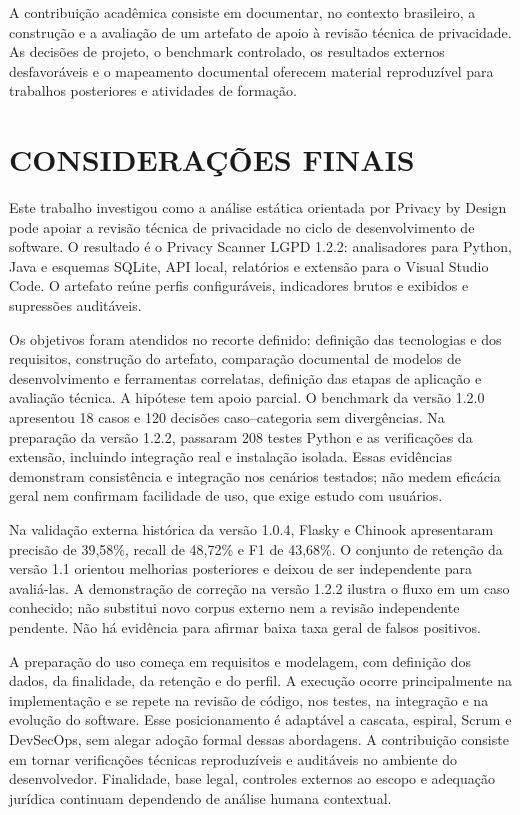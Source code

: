 \documentclass[12pt,a4paper,oneside]{report}
\begin{document}
A contribuição acadêmica consiste em documentar, no contexto brasileiro, a construção e a avaliação de um artefato de apoio à revisão técnica de privacidade. As decisões de projeto, o benchmark controlado, os resultados externos desfavoráveis e o mapeamento documental oferecem material reproduzível para trabalhos posteriores e atividades de formação.

\chapter{CONSIDERAÇÕES FINAIS}

Este trabalho investigou como a análise estática orientada por Privacy by Design pode apoiar a revisão técnica de privacidade no ciclo de desenvolvimento de software. O resultado é o Privacy Scanner LGPD 1.2.2: analisadores para Python, Java e esquemas SQLite, API local, relatórios e extensão para o Visual Studio Code. O artefato reúne perfis configuráveis, indicadores brutos e exibidos e supressões auditáveis.

Os objetivos foram atendidos no recorte definido: definição das tecnologias e dos requisitos, construção do artefato, comparação documental de modelos de desenvolvimento e ferramentas correlatas, definição das etapas de aplicação e avaliação técnica. A hipótese tem apoio parcial. O benchmark da versão 1.2.0 apresentou 18 casos e 120 decisões caso--categoria sem divergências. Na preparação da versão 1.2.2, passaram 208 testes Python e as verificações da extensão, incluindo integração real e instalação isolada. Essas evidências demonstram consistência e integração nos cenários testados; não medem eficácia geral nem confirmam facilidade de uso, que exige estudo com usuários.

Na validação externa histórica da versão 1.0.4, Flasky e Chinook apresentaram precisão de 39,58\%, recall de 48,72\% e F1 de 43,68\%. O conjunto de retenção da versão 1.1 orientou melhorias posteriores e deixou de ser independente para avaliá-las. A demonstração de correção na versão 1.2.2 ilustra o fluxo em um caso conhecido; não substitui novo corpus externo nem a revisão independente pendente. Não há evidência para afirmar baixa taxa geral de falsos positivos.

A preparação do uso começa em requisitos e modelagem, com definição dos dados, da finalidade, da retenção e do perfil. A execução ocorre principalmente na implementação e se repete na revisão de código, nos testes, na integração e na evolução do software. Esse posicionamento é adaptável a cascata, espiral, Scrum e DevSecOps, sem alegar adoção formal dessas abordagens. A contribuição consiste em tornar verificações técnicas reproduzíveis e auditáveis no ambiente do desenvolvedor. Finalidade, base legal, controles externos ao escopo e adequação jurídica continuam dependendo de análise humana contextual.
\end{document}
